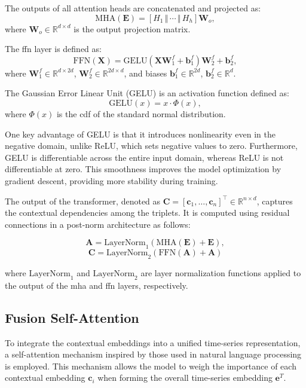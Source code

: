 The outputs of all attention heads are concatenated and projected as:
\[
\text{MHA}(\mathbf{E}) = \left[ H_1 \, \Vert \, \cdots \, \Vert \, H_h \right] \mathbf{W}_o,
\]
where \(\mathbf{W}_o \in \mathbb{R}^{d \times d}\) is the output projection matrix.

The \gls{ffn} layer is defined as:
\[
\text{FFN}(\mathbf{X}) = \text{GELU}(\mathbf{X} \mathbf{W}_1^f + \mathbf{b}_1^f) \mathbf{W}_2^f + \mathbf{b}_2^f,
\]
where \(\mathbf{W}_1^f \in \mathbb{R}^{d \times 2d}\), \(\mathbf{W}_2^f \in \mathbb{R}^{2d \times d}\), and biases \(\mathbf{b}_1^f \in \mathbb{R}^{2d}\), \(\mathbf{b}_2^f \in \mathbb{R}^d\).

The Gaussian Error Linear Unit (GELU) \cite{gelu} is an activation function defined as:
\[
\text{GELU}(x) = x \cdot \Phi(x),
\]
where \( \Phi(x) \) is the \gls{cdf} of the standard normal distribution.

One key advantage of GELU is that it introduces nonlinearity even in the negative domain, unlike ReLU, which sets negative values to zero. Furthermore, GELU is differentiable across the entire input domain, whereas ReLU is not differentiable at zero. This smoothness improves the model optimization by gradient descent, providing more stability during training.

The output of the transformer, denoted as \(\mathbf{C} = [\mathbf{c}_1, \dots, \mathbf{c}_n]^\top \in \mathbb{R}^{n \times d}\), captures the contextual dependencies among the triplets. It is computed using residual connections in a post-norm architecture as follows:

\[
\mathbf{A} = \text{LayerNorm}_1\left(\text{MHA}(\mathbf{E}) + \mathbf{E}\right),
\]
\[
\mathbf{C} = \text{LayerNorm}_2\left(\text{FFN}(\mathbf{A}) + \mathbf{A}\right)
\]

where \(\text{LayerNorm}_1\) and \(\text{LayerNorm}_2\) are layer normalization functions applied to the output of the \gls{mha} and \gls{ffn} layers, respectively.

\subsection{Fusion Self-Attention}
\label{sec:fusion_self_attention}

To integrate the contextual embeddings into a unified time-series representation, a self-attention mechanism inspired by those used in natural language processing is employed. This mechanism allows the model to weigh the importance of each contextual embedding \(\mathbf{c}_i\) when forming the overall time-series embedding \(\mathbf{e}^T\).


